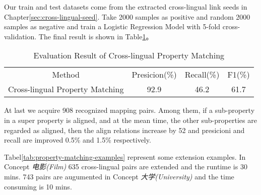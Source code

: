 \documentclass[runningheads,a4paper]{llncs}
\begin{document}
%
%
%

Our train and test datasets come from the extracted cross-lingual link seeds in Chapter\ref{sec:cross-lingual-seed}. Take 2000 samples as positive and random 2000 samples as negative and train a Logistic Regression Model with 5-fold cross-validation. The final result is shown in Table\ref{tab:property-matching-result}。
\begin{table}[htb]
  \centering
  \caption{Evaluation Result of Cross-lingual Property Matching}
  \label{tab:property-matching-result}
    \begin{tabular}{cccc}
      {Method} & {Presicion(\%)} & {Recall(\%)} & {F1(\%)}  \\
      Cross-lingual Property Matching & 92.9 & 46.2 & 61.7 \\
    \end{tabular}
\end{table}

At last we acquire 908 recognized mapping pairs. Among them, if a sub-property in a super property is aligned, and at the mean time, the other sub-properties are regarded as aligned, then the align relations increase by 52 and presicioni and recall are improved 0.5\% and 1.5\% respectively.

Tabel\ref{tab:property-matching-examples} represent some extension examples. In Concept \textit{电影(Film)} 635 cross-lingual pairs are extended and the runtime is 30 mins. 743 pairs are augumented in Concept \textit{大学(University)} and the time consuming is 10 mins.
\end{document}
